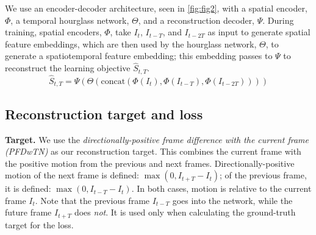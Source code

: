 We use an encoder-decoder architecture, seen in \cref{fig:fig2}, with a spatial encoder, $\Phi$, a temporal hourglass network, $\Theta$, and a reconstruction decoder, $\Psi$. During training, spatial encoders, $\Phi$, take $I_t$, $I_{t-T}$, and $I_{t-2T}$ as input to generate spatial feature embeddings, which are then used by the hourglass network, $\Theta$, to generate a spatiotemporal feature embedding; this embedding passes to $\Psi$ to reconstruct the learning objective $\hat{S}_{t,T}$.
\begin{equation}
\hat{S}_{t,T}=\Psi(\Theta(\text{concat}(\Phi(I_t), \Phi(I_{t-T}), \Phi(I_{t-2T}))))
\end{equation}

\subsection{Reconstruction target and loss}\label{sec:reconstruction}

\textbf{Target.} 
We use the \textit{directionally-positive frame difference with the current frame (PFDwTN)} as our reconstruction target. This combines the current frame with the positive motion from the previous and next frames. Directionally-positive motion of the next frame is defined: $\max(0, I_{t+T} - I_t)$; of the previous frame, it is defined: $\max(0, I_{t-T} - I_t)$. In both cases, motion is relative to the current frame $I_t$. Note that the previous frame $I_{t-T}$ goes into the network, while the future frame $I_{t+T}$ does \textit{not}. It is used only when calculating the ground-truth target for the loss.
 
